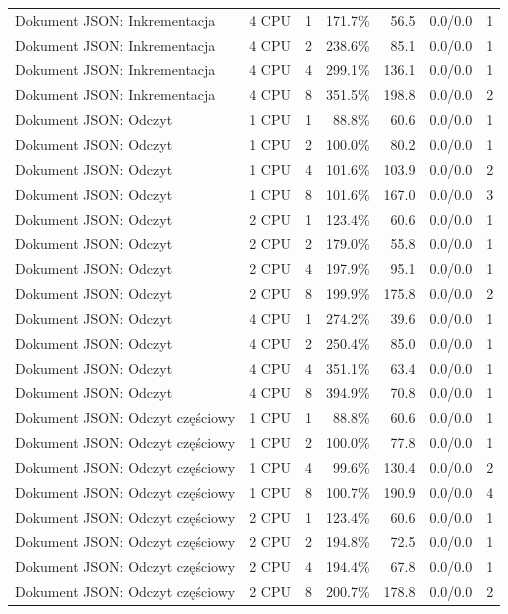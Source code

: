\begin{table}[ht]
{\begin{tabular}{llcrrcc}
Dokument JSON: Inkrementacja & 4 CPU & 1 & 171.7\% & 56.5 & 0.0/0.0 & 1 \\
Dokument JSON: Inkrementacja & 4 CPU & 2 & 238.6\% & 85.1 & 0.0/0.0 & 1 \\
Dokument JSON: Inkrementacja & 4 CPU & 4 & 299.1\% & 136.1 & 0.0/0.0 & 1 \\
Dokument JSON: Inkrementacja & 4 CPU & 8 & 351.5\% & 198.8 & 0.0/0.0 & 2 \\
Dokument JSON: Odczyt & 1 CPU & 1 & 88.8\% & 60.6 & 0.0/0.0 & 1 \\
Dokument JSON: Odczyt & 1 CPU & 2 & 100.0\% & 80.2 & 0.0/0.0 & 1 \\
Dokument JSON: Odczyt & 1 CPU & 4 & 101.6\% & 103.9 & 0.0/0.0 & 2 \\
Dokument JSON: Odczyt & 1 CPU & 8 & 101.6\% & 167.0 & 0.0/0.0 & 3 \\
Dokument JSON: Odczyt & 2 CPU & 1 & 123.4\% & 60.6 & 0.0/0.0 & 1 \\
Dokument JSON: Odczyt & 2 CPU & 2 & 179.0\% & 55.8 & 0.0/0.0 & 1 \\
Dokument JSON: Odczyt & 2 CPU & 4 & 197.9\% & 95.1 & 0.0/0.0 & 1 \\
Dokument JSON: Odczyt & 2 CPU & 8 & 199.9\% & 175.8 & 0.0/0.0 & 2 \\
Dokument JSON: Odczyt & 4 CPU & 1 & 274.2\% & 39.6 & 0.0/0.0 & 1 \\
Dokument JSON: Odczyt & 4 CPU & 2 & 250.4\% & 85.0 & 0.0/0.0 & 1 \\
Dokument JSON: Odczyt & 4 CPU & 4 & 351.1\% & 63.4 & 0.0/0.0 & 1 \\
Dokument JSON: Odczyt & 4 CPU & 8 & 394.9\% & 70.8 & 0.0/0.0 & 1 \\
Dokument JSON: Odczyt częściowy & 1 CPU & 1 & 88.8\% & 60.6 & 0.0/0.0 & 1 \\
Dokument JSON: Odczyt częściowy & 1 CPU & 2 & 100.0\% & 77.8 & 0.0/0.0 & 1 \\
Dokument JSON: Odczyt częściowy & 1 CPU & 4 & 99.6\% & 130.4 & 0.0/0.0 & 2 \\
Dokument JSON: Odczyt częściowy & 1 CPU & 8 & 100.7\% & 190.9 & 0.0/0.0 & 4 \\
Dokument JSON: Odczyt częściowy & 2 CPU & 1 & 123.4\% & 60.6 & 0.0/0.0 & 1 \\
Dokument JSON: Odczyt częściowy & 2 CPU & 2 & 194.8\% & 72.5 & 0.0/0.0 & 1 \\
Dokument JSON: Odczyt częściowy & 2 CPU & 4 & 194.4\% & 67.8 & 0.0/0.0 & 1 \\
Dokument JSON: Odczyt częściowy & 2 CPU & 8 & 200.7\% & 178.8 & 0.0/0.0 & 2 \\

\end{tabular}}
\end{table}

